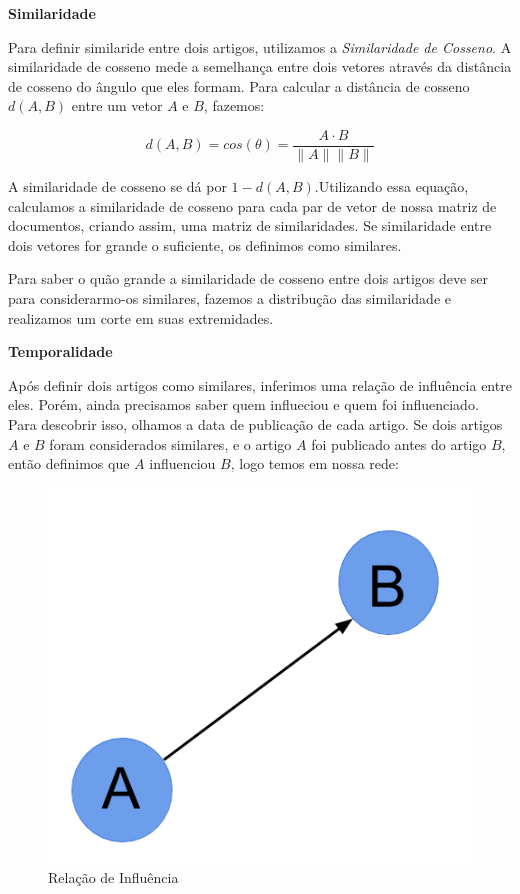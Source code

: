 \documentclass[a4paper,12pt]{article}
\begin{document}
 \begin{description}
  \item \textbf{Similaridade}
  
    Para definir similaride entre dois artigos, utilizamos a \textit{Similaridade de Cosseno}. A similaridade de cosseno mede a semelhança entre
    dois vetores através da distância de cosseno do ângulo que eles formam. Para calcular a distância de cosseno $d(A,B)$ entre um vetor $A$ e $B$, fazemos:
    
    \begin{equation}
      d(A,B) = cos(\theta) = \dfrac{A \cdot B}{\parallel A\parallel \parallel B \parallel}
    \end{equation}

    
    A similaridade de cosseno se dá por $1-d(A,B)$.Utilizando essa equação, calculamos a similaridade de cosseno para cada
    par de vetor de nossa matriz de documentos, criando assim, uma matriz de similaridades. Se similaridade entre dois vetores for 
    grande o suficiente, os definimos como similares. 
    
    Para saber o quão grande a similaridade de cosseno entre dois artigos deve ser para considerarmo-os similares, fazemos a
    distribução das similaridade e realizamos um corte em suas extremidades.
    
    
  \item \textbf{Temporalidade}
  
    Após definir dois artigos como similares, inferimos uma relação de influência entre eles. Porém, ainda precisamos saber quem influeciou e quem
    foi influenciado. Para descobrir isso, olhamos a data de publicação de cada artigo. Se dois artigos $A$ e $B$ foram considerados 
    similares, e o artigo $A$ foi publicado antes do artigo $B$, então definimos que $A$ influenciou $B$, logo temos em nossa rede:
    
    \begin{figure}[h]
      \centering
      \includegraphics[scale=0.2]{./rede2.png}
      \caption{Relação de Influência}
    \end{figure}
    

\end{description}
\end{document}
